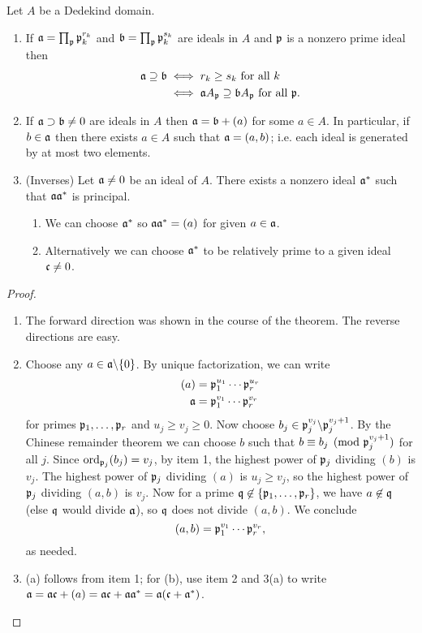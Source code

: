 \begin{cor}
Let $A$ be a Dedekind domain.
\begin{enumerate}
\item
If $\mathfrak{a}=\prod_{\mathfrak{p}} \mathfrak{p}_k^{r_k}$ and 
$\mathfrak{b}=\prod_{\mathfrak{p}} \mathfrak{p}_k^{s_k}$ are ideals in $A$ and $\mathfrak{p}$ is a nonzero prime ideal then
\begin{align*}
\mathfrak{a}\supseteq \mathfrak{b}&\iff r_k\ge s_k\text{ for all }k\\
&\iff \mathfrak{a} A_{\mathfrak{p}}\supseteq \mathfrak{b} A_{\mathfrak{p}} \text{ for all }\mathfrak{p}.
\end{align*}
\item
If $\mathfrak{a}\supset \mathfrak{b}\neq 0$ are ideals in $A$ then $\mathfrak{a}=\mathfrak{b}+(a)$ for some $a\in A$. In particular, if $b\in \mathfrak{a}$ then there exists $a\in A$ such that $\mathfrak{a}=(a,b)$; i.e. each ideal is generated by at most two elements.
\item (Inverses)
Let $\mathfrak{a}\ne 0$ be an ideal of $A$. There exists a nonzero ideal $\mathfrak{a}^*$ such that $\mathfrak{a}\mathfrak{a}^*$ is principal.
\begin{enumerate}
\item
We can choose $\mathfrak{a}^*$ so $\mathfrak{a}\mathfrak{a}^*=(a)$ for given $a\in \mathfrak{a}$. 
\item
Alternatively we can choose $\mathfrak{a}^*$ to be relatively prime to a given ideal $\mathfrak{c}\ne 0$. 
\end{enumerate}
\end{enumerate}
\end{cor}
\begin{proof}
\begin{enumerate}
\item The forward direction was shown in the course of the theorem. The reverse directions are easy. 
\item Choose any $a\in \mathfrak{a}\backslash\{0\}$. By unique factorization, we can write
\begin{align*}
(a)&=\mathfrak{p}_1^{u_1}\cdots \mathfrak{p}_{r}^{u_r}\\
\mathfrak{a}&=\mathfrak{p}_1^{v_1}\cdots \mathfrak{p}_{r}^{v_r}
\end{align*}
for primes $\mathfrak{p}_1,\ldots, \mathfrak{p}_r$ and $u_j\ge v_j\ge 0$. Now choose $b_j\in \mathfrak{p}_j^{v_j}\backslash\mathfrak{p}_j^{v_{j}+1}$. By the Chinese remainder theorem we can choose $b$ such that $b\equiv b_j\pmod{\mathfrak{p}_j^{v_j+1}}$ for all $j$. 
Since $\operatorname{ord}_{\mathfrak{p}_j}(b_j)=v_j$, by item 1, the highest power of $\mathfrak{p}_j$ dividing $(b)$ is $v_j$. The highest power of $\mathfrak{p}_j$ dividing $(a)$ is $u_j\ge v_j$, so the highest power of $\mathfrak{p}_j$ dividing $(a,b)$ is $v_j$.
Now for a prime $\mathfrak{q}\not\in\{\mathfrak{p}_1,\ldots, \mathfrak{p}_r\}$, we have $a\not\in \mathfrak{q}$ (else $\mathfrak{q}$ would divide $\mathfrak{a}$), so $\mathfrak{q}$ does not divide $(a,b)$. We conclude
\[
(a,b)=\mathfrak{p}_1^{v_1}\cdots \mathfrak{p}_{r}^{v_r},
\]
as needed.
\item (a) follows from item 1; for (b), use item 2 and 3(a) to write $\mathfrak{a}=\mathfrak{a} \mathfrak{c}+(a)=\mathfrak{a}\mathfrak{c} + \mathfrak{a}\mathfrak{a}^*=\mathfrak{a}(\mathfrak{c}+\mathfrak{a}^*)$.
\end{enumerate}
\end{proof}
